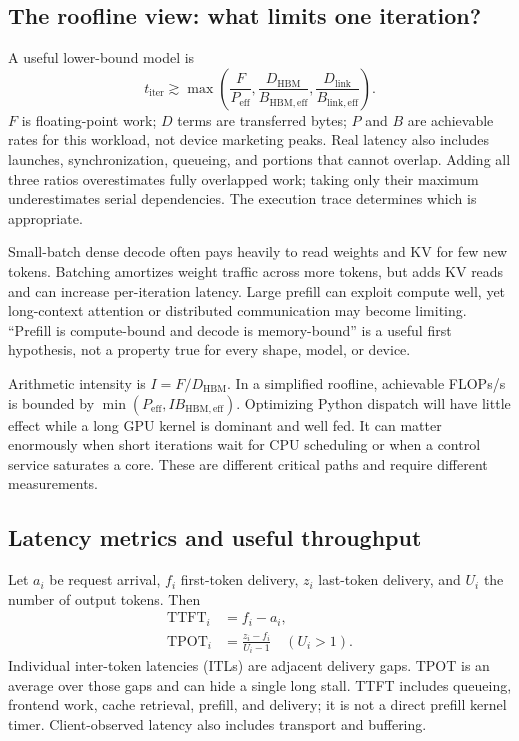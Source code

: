 \subsection{The roofline view: what limits one iteration?}
A useful lower-bound model is
\begin{equation}
 t_{\mathrm{iter}}\gtrsim
 \max\left(\frac{F}{P_{\mathrm{eff}}},
           \frac{D_{\mathrm{HBM}}}{B_{\mathrm{HBM,eff}}},
           \frac{D_{\mathrm{link}}}{B_{\mathrm{link,eff}}}\right).
 \label{eq:roofline}
\end{equation}
$F$ is floating-point work; $D$ terms are transferred bytes; $P$ and $B$ are
achievable rates for this workload, not device marketing peaks. Real latency
also includes launches, synchronization, queueing, and portions that cannot
overlap. Adding all three ratios overestimates fully overlapped work; taking
only their maximum underestimates serial dependencies. The execution trace
determines which is appropriate.

Small-batch dense decode often pays heavily to read weights and KV for few new
tokens. Batching amortizes weight traffic across more tokens, but adds KV reads
and can increase per-iteration latency. Large prefill can exploit compute well,
yet long-context attention or distributed communication may become limiting.
``Prefill is compute-bound and decode is memory-bound'' is a useful first
hypothesis, not a property true for every shape, model, or device.

Arithmetic intensity is $I=F/D_{\mathrm{HBM}}$. In a simplified roofline,
achievable FLOPs/s is bounded by $\min(P_{\mathrm{eff}}, I B_{\mathrm{HBM,eff}})$.
Optimizing Python dispatch will have little effect while a long GPU kernel is
dominant and well fed. It can matter enormously when short iterations wait for
CPU scheduling or when a control service saturates a core. These are different
critical paths and require different measurements.

\subsection{Latency metrics and useful throughput}
Let $a_i$ be request arrival, $f_i$ first-token delivery, $z_i$ last-token
delivery, and $U_i$ the number of output tokens. Then
\begin{align}
 \mathrm{TTFT}_i &= f_i-a_i,\\
 \mathrm{TPOT}_i &= \frac{z_i-f_i}{U_i-1}\quad(U_i>1).
\end{align}
Individual inter-token latencies (ITLs) are adjacent delivery gaps. TPOT is an
average over those gaps and can hide a single long stall. TTFT includes queueing,
frontend work, cache retrieval, prefill, and delivery; it is not a direct prefill
kernel timer. Client-observed latency also includes transport and buffering.

